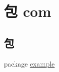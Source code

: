\hypertarget{namespacecom}{}\section{包 com}
\label{namespacecom}
\subsection*{包}
\begin{DoxyCompactItemize}
\item 
package \mbox{\hyperlink{namespacecom_1_1example}{example}}
\end{DoxyCompactItemize}
